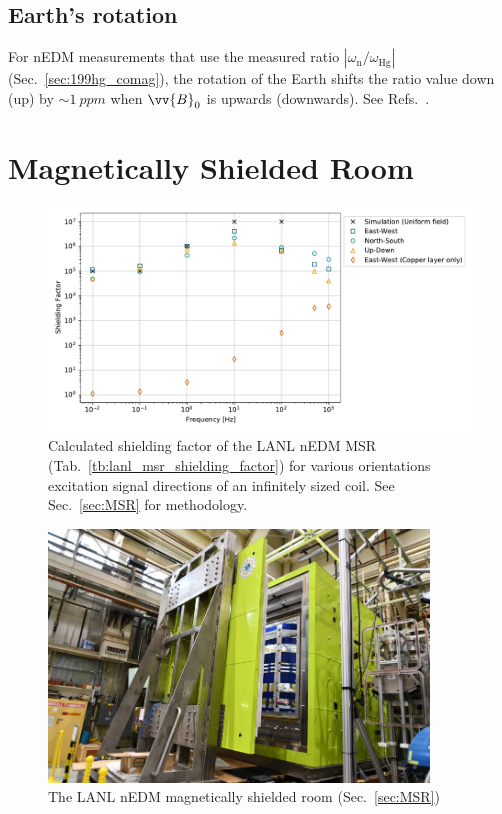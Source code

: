 \subsection*{Earth's rotation}

For nEDM measurements that use the measured ratio $|\omega_\text{n}/\omega_\text{Hg}|$ (Sec.~\ref{sec:199hg_comag}), the rotation of the Earth shifts the ratio value down (up) by $\sim\qty{1}{ppm}$ when $\vv{B}_0$ is upwards (downwards). See Refs.~\cite{lamoreaux_earth_rotation_comment, baker_reply_to_lamoreaux, pendlebury_revised_2015}.


\section
{
    \texorpdfstring{Magnetically Shielded Room}
                    {Magnetically Shielded Room}\label{sec:MSR}
}


\begin{figure}
    \centering
    \includegraphics[width=\textwidth]{figures/chupp_msr_data.pdf}
    \caption
    {Calculated shielding factor of the LANL nEDM MSR (Tab.~\ref{tb:lanl_msr_shielding_factor}) for various orientations excitation signal directions of an infinitely sized coil. See Sec.~\ref{sec:MSR} for methodology.}
    \label{fig:MSR-shielding-factor}
\end{figure}

\begin{figure}
    \centering
    \includegraphics[width=0.9\textwidth]{figures/completed_msr.jpg}
    \caption
    {The LANL nEDM magnetically shielded room (Sec.~\ref{sec:MSR})}
    \label{fig:MSR}
\end{figure}

